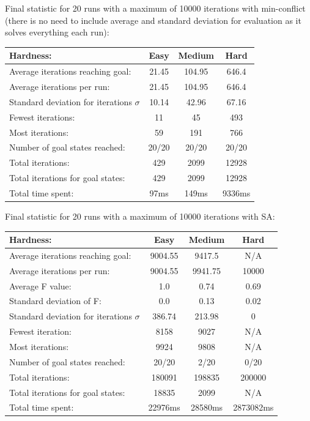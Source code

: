 \documentclass[12pt, a4paper]{article}
\begin{document}
\noindent
Final statistic for 20 runs with a maximum of 10000 iterations with min-conflict (there is no need to include average and standard deviation for evaluation as it solves everything each run):\\
\begin{center}
  \begin{tabular}{| l | c c c|}
    \hline
    Hardness: &\textbf{Easy} & \textbf{Medium} & \textbf{Hard} \\ \hline
    Average iterations reaching goal: & 21.45& 104.95& 646.4\\
    Average iterations per run:  & 21.45 & 104.95 &  646.4\\
    Standard deviation for iterations $\sigma$ & 10.14 & 42.96 & 67.16\\
    Fewest iterations: & 11 & 45& 493\\ 
    Most iterations: & 59 & 191& 766\\ 
    Number of goal states reached: & 20/20 & 20/20 & 20/20\\
    Total iterations: & 429 & 2099& 12928\\
    Total iterations for goal states: & 429 & 2099& 12928\\
    Total time spent: & 97ms& 149ms & 9336ms\\
    \hline
  \end{tabular}
\end{center}
Final statistic for 20 runs with a maximum of 10000 iterations with SA: \\
\begin{center}
  \begin{tabular}{| l | c c c|}
    \hline
    Hardness: &\textbf{Easy} & \textbf{Medium} & \textbf{Hard} \\ \hline
    Average iterations reaching goal: & 9004.55& 9417.5 & N/A\\
    Average iterations per run:  & 9004.55 & 9941.75 &  10000\\
    Average F value: & 1.0 & 0.74 & 0.69\\
    Standard deviation of F: & 0.0 & 0.13& 0.02\\
    Standard deviation for iterations $\sigma$ & 386.74 & 213.98 & 0\\
    Fewest iteration: & 8158 & 9027& N/A\\ 
    Most iterations: & 9924 & 9808& N/A\\ 
    Number of goal states reached: & 20/20 & 2/20 & 0/20\\
    Total iterations: & 180091 & 198835& 200000\\
    Total iterations for goal states: & 18835 & 2099& N/A\\
    Total time spent: & 22976ms & 28580ms & 2873082ms\\
    \hline
  \end{tabular}
\end{center}
\end{document}
